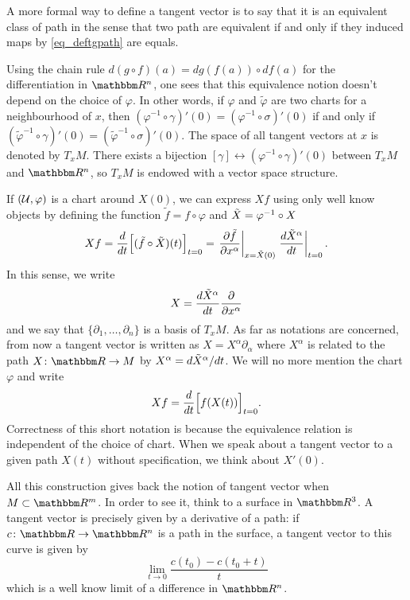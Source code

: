 A more formal way to define a tangent vector is to say that it is an equivalent class of path in the sense that two path are equivalent if and only if they induced maps by \eqref{eq_deftgpath} are equals. 

Using the chain rule $d(g\circ f)(a)=dg(f(a))\circ df(a)$ for the differentiation in $\eR^n$, one sees that this equivalence notion doesn't depend on the choice of $\varphi$. In other words, if $\varphi$ and $\tilde{\varphi}$ are two charts for a neighbourhood of $x$, then $(\varphi^{-1} \circ\gamma)'(0)=(\varphi^{-1} \circ\sigma)'(0)$ if and only if $(\tilde{\varphi}^{-1} \circ\gamma)'(0)=(\tilde{\varphi}^{-1} \circ\sigma)'(0)$. The space of all tangent vectors at $x$ is denoted by $T_xM$. There exists a bijection $[\gamma]\leftrightarrow (\varphi^{-1}\circ\gamma)'(0)$ between $T_xM$ and $\eR^n$, so $T_xM$ is endowed with a vector space structure.

If $(\mathcal{U},\varphi)$ is a chart around $X(0)$, we can express $Xf$ using only well know objects by defining the function $\tilde f =f\circ\varphi$ and $\tilde{X}=\varphi^{-1}\circ X$
\[
  Xf=\frac{d}{dt}\Big[ (\tilde f \circ\tilde{X})(t) \Big]_{t=0}=\left.\frac{\partial \tilde f }{\partial x^{\alpha}}\right|_{x=\tilde{X}(0)}\left.\frac{d\tilde{X}^{\alpha}}{dt}\right|_{t=0}.
\]
In this sense, we write
\begin{equation}
  X=\frac{d\tilde{X}^{\alpha}}{dt} \frac{\partial }{\partial x^{\alpha}}
\end{equation}
and we say that $\{\partial_1,\ldots,\partial_n\}$ is a basis of $T_xM$. As far as notations are concerned, from now a tangent vector is written as $X=X^{\alpha}\partial_{\alpha}$ where $X^{\alpha}$ is related to the path $\dpt{X}{\eR}{M}$ by $X^{\alpha}=d\tilde{X}^{\alpha}/dt$. We will no more mention the chart $\varphi$ and write
\[
  Xf=\frac{d}{dt}\Big[f(X(t))\Big]_{t=0}.
\]
Correctness of this short notation is because the equivalence relation is independent of the choice of chart. When we speak about a tangent vector to a given path $X(t)$ without specification, we think about $X'(0)$.

All this construction gives back the notion of tangent vector when $M\subset \eR^m$. In order to see it, think to a surface in $\eR^3$. A tangent vector is precisely given by a derivative of a path: if $\dpt{c}{\eR}{\eR^n}$ is a path in the surface, a tangent vector to this curve is given by
\[
   \lim_{t\to 0}\frac{c(t_0)-c(t_0+t)}{t}
\]
which is a well know limit of a difference in $\eR^n$.

